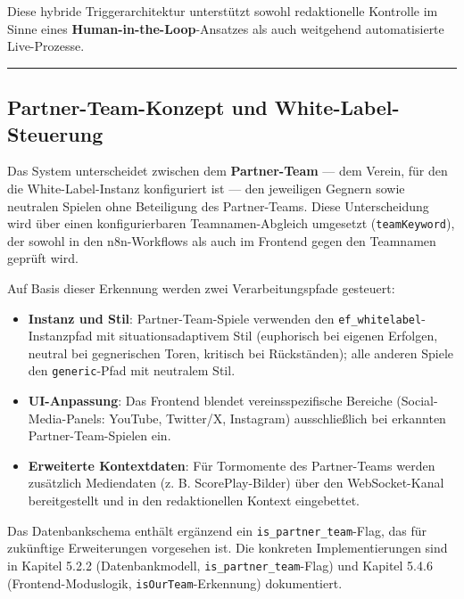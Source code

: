 Diese hybride Triggerarchitektur unterstützt sowohl redaktionelle
Kontrolle im Sinne eines \textbf{Human-in-the-Loop}-Ansatzes als auch
weitgehend automatisierte Live-Prozesse.

\begin{center}\rule{0.5\linewidth}{0.5pt}\end{center}

\subsection{Partner-Team-Konzept und
White-Label-Steuerung}\label{partner-team-konzept-und-white-label-steuerung}

Das System unterscheidet zwischen dem \textbf{Partner-Team} --- dem
Verein, für den die White-Label-Instanz konfiguriert ist --- den
jeweiligen Gegnern sowie neutralen Spielen ohne Beteiligung des
Partner-Teams. Diese Unterscheidung wird über einen konfigurierbaren
Teamnamen-Abgleich umgesetzt (\texttt{teamKeyword}), der sowohl in den
n8n-Workflows als auch im Frontend gegen den Teamnamen geprüft wird.

Auf Basis dieser Erkennung werden zwei Verarbeitungspfade gesteuert:

\begin{itemize}
\tightlist
\item
  \textbf{Instanz und Stil}: Partner-Team-Spiele verwenden den
  \texttt{ef\_whitelabel}-Instanzpfad mit situationsadaptivem Stil
  (euphorisch bei eigenen Erfolgen, neutral bei gegnerischen Toren,
  kritisch bei Rückständen); alle anderen Spiele den
  \texttt{generic}-Pfad mit neutralem Stil.
\item
  \textbf{UI-Anpassung}: Das Frontend blendet vereinsspezifische
  Bereiche (Social-Media-Panels: YouTube, Twitter/X, Instagram)
  ausschließlich bei erkannten Partner-Team-Spielen ein.
\item
  \textbf{Erweiterte Kontextdaten}: Für Tormomente des Partner-Teams
  werden zusätzlich Mediendaten (z. B. ScorePlay-Bilder) über den
  WebSocket-Kanal bereitgestellt und in den redaktionellen Kontext
  eingebettet.
\end{itemize}

Das Datenbankschema enthält ergänzend ein
\texttt{is\_partner\_team}-Flag, das für zukünftige Erweiterungen
vorgesehen ist. Die konkreten Implementierungen sind in Kapitel 5.2.2
(Datenbankmodell, \texttt{is\_partner\_team}-Flag) und Kapitel 5.4.6
(Frontend-Moduslogik, \texttt{isOurTeam}-Erkennung) dokumentiert.

